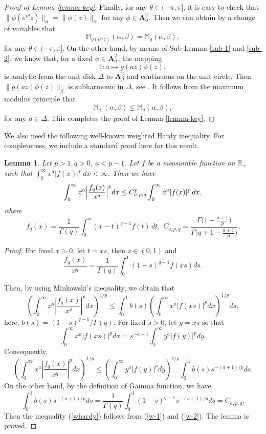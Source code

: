 \documentclass[10pt]{amsart}
\newtheorem{lemma}[theorem]{Lemma}
\theoremstyle{definition}    %
\numberwithin{equation}{section}
\begin{document}
\begin{proof}[Proof of Lemma \ref{lemma-key}]
Finally, for any $\theta \in (-\pi, \pi]$, it is easy to check that $\|\phi(e^{i\theta} z)\|_{\alpha}=\|\phi(z)\|_{\alpha}$ for any $\phi \in \mathbf{A}_{\alpha}^2$. Then we can obtain by a change of variables that $$\mathbb{M}_{g(e^{i\theta}z)}(\alpha, \beta)=\mathbb{M}_g(\alpha, \beta),$$
for any $\theta \in (-\pi, \pi]$. On the other hand, by means of Sub-Lemma \ref{sub-1} and \ref{sub-2}, we know that, for a fixed $\phi \in \mathbf{A}_{\alpha}^2$, the mapping 
$$\ddag: a\mapsto g(az)\phi(z),$$
is analytic from the unit disk $\Delta$ to $\mathbf{A}_{\beta}^2$ and continuous on the unit circle. Then $\|g(az)\phi(z)\|_{\beta}$ is subharmonic in $\Delta$, see \cite{HP}. It follows from the maximum modulus principle that 
$$\mathbb{M}_{g_a}(\alpha, \beta)\leq\mathbb{M}_g(\alpha, \beta),$$
for any $a\in \Delta$. This completes the proof of Lemma \ref{lemma-key}.
\end{proof}

We also need the following well-known weighted Hardy inequality. For completeness, we include a standard proof here for this result. 
\begin{lemma}\label{last}Let $p>1, q>0$, $a<p-1$. Let $f$ be a measurable function on $\mathbb{R}_{+}$ such that $\int_0^\infty x^{a}|f(x)|^p\,dx<\infty$. Then we have
\begin{equation}\label{whardy}
\int_0^\infty x^{a}\Bigl|\frac{f_q(x)}{x^q}\Bigr|^pdx\leq C_{a,p,q}^p\int_0^\infty x^{a}|f(x)|^p\,dx,
\end{equation}
where 
$$f_q(x)=\frac{1}{\Gamma(q)}\int_0^x (x-t)^{q-1}f(t)\,dt, \, \,C_{a,p,q}=\frac{\Gamma\bigl(1-\frac{a+1}{p}\bigr)}{\Gamma\bigl(q+1-\frac{a+1}{p}\bigr)}.
$$
\end{lemma}
\begin{proof}
For fixed $x>0$, let $t = xs$, then $s \in (0,1)$ and
$$
\frac{f_q(x)}{x^q} = \frac{1}{\Gamma(q)} \int_0^1 (1-s)^{q-1} f(xs)ds.
$$

Then, by using Minkowski's inequality, we obtain that
$$
\left(\int_0^\infty x^a \left| \frac{f_q(x)}{x^q} \right|^p dx \right)^{1/p}
\leq \int_0^1 b(s) \left( \int_0^\infty x^a |f(xs)|^p dx \right)^{1/p}ds,
$$
here, $b(s) = {(1-s)^{q-1}}/{\Gamma(q)}$. For fixed $s>0$, let $y = xs$ so that
$$
\int_0^\infty x^a |f(xs)|^pdx = s^{-a-1} \int_0^\infty y^a |f(y)|^p dy.
$$
Consequently, 
\begin{equation}\label{w-1}\left( \int_0^\infty x^a \left| \frac{f_q(x)}{x^q} \right|^p dx \right)^{1/p}
\leq  \left( \int_0^\infty y^a |f(y)|^p dy \right)^{1/p}\int_0^1 b(s) s^{-(a+1)/p}ds.\end{equation}
On the other hand, by the definition of Gamma function, we have 
\begin{equation}\label{w-2}
\int_0^1 b(s) s^{-(a+1)/p}ds=\frac{1}{\Gamma(q)} \int_0^1 (1-s)^{q-1}s^{-(a+1)/p}ds=C_{a,p,q}.\nonumber
\end{equation}
Then the inequality (\ref{whardy}) follows from (\ref{w-1}) and (\ref{w-2}). The lemma is proved.
\end{proof}
\end{document}
